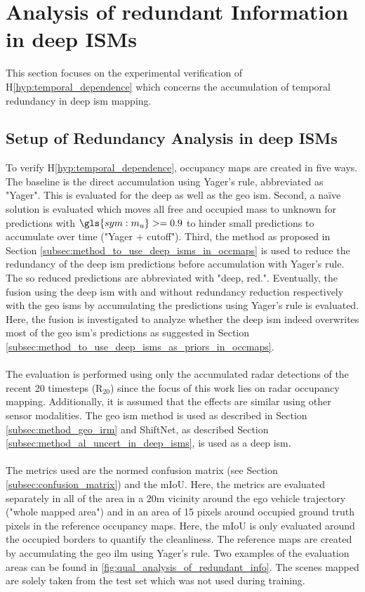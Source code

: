 \section{Analysis of redundant Information in deep ISMs}
\label{sec:exp_analyze_redundant_info}
This section focuses on the experimental verification of H\ref{hyp:temporal_dependence} which concerns the accumulation of temporal redundancy in deep \gls{ism} mapping.
%
\subsection{Setup of Redundancy Analysis in deep ISMs}
\label{subsec:setup_of_red_analy}
To verify H\ref{hyp:temporal_dependence}, occupancy maps are created in five ways. The baseline is the direct accumulation using Yager's rule, abbreviated as "Yager". This is evaluated for the deep as well as the geo \gls{ism}. Second, a na\"ive solution is evaluated which moves all free and occupied mass to unknown for predictions with $\gls{sym:m_u}>=0.9$ to hinder small predictions to accumulate over time ("Yager + cutoff"). Third, the method as proposed in Section \ref{subsec:method_to_use_deep_isms_in_occmaps} is used to reduce the redundancy of the deep \gls{ism} predictions before accumulation with Yager's rule. The so reduced predictions are abbreviated with "deep, red.". Eventually, the fusion using the deep \gls{ism} with and without redundancy reduction respectively with the geo \gls{ism}s by accumulating the predictions using Yager's rule is evaluated. Here, the fusion is investigated to analyze whether the deep \gls{ism} indeed overwrites most of the geo \gls{ism}'s predictions as suggested in Section \ref{subsec:method_to_use_deep_isms_as_priors_in_occmaps}.
\\\\
The evaluation is performed using only the accumulated radar detections of the recent 20 timesteps (R$_{20}$) since the focus of this work lies on radar occupancy mapping. Additionally, it is assumed that the effects are similar using other sensor modalities. The geo \gls{ism} method is used as described in Section \ref{subsec:method_geo_irm} and ShiftNet, as described Section \ref{subsec:method_al_uncert_in_deep_isms}, is used as a deep \gls{ism}.
\\\\
The metrics used are the normed confusion matrix (see Section \ref{subsec:confusion_matrix}) and the mIoU. Here, the metrics are evaluated separately in all of the area in a 20m vicinity around the ego vehicle trajectory ("whole mapped area") and in an area of 15 pixels around occupied ground truth pixels in the reference occupancy maps. Here, the mIoU is only evaluated around the occupied borders to quantify the cleanliness. The reference maps are created by accumulating the geo \gls{ilm} using Yager's rule. Two examples of the evaluation areas can be found in \ref{fig:qual_analysis_of_redundant_info}. The scenes mapped are solely taken from the test set which was not used during training.
%
